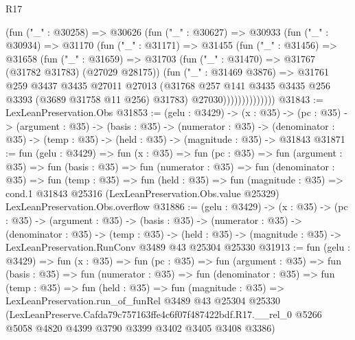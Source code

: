 \begin{lexlean}{R17}
\begin{coremodule}
                  (fun ("_" : @30258) =>
                  @30626
                    (fun ("_" : @30627) =>
                    @30933
                      (fun ("_" : @30934) =>
                      @31170
                        (fun ("_" : @31171) =>
                        @31455
                          (fun ("_" : @31456) =>
                          @31658
                            (fun ("_" : @31659) =>
                            @31703
                              (fun ("_" : @31470) => @31767 (@31782 @31783) (@27029 @28175))
                              (fun ("_" : @31469 @3876) =>
                              @31761
                                @259
                                @3437
                                @3435
                                @27011
                                @27013
                                (@31768
                                  @257
                                  @141
                                  @3435
                                  @3435
                                  @256
                                  @3393
                                  (@3689 @31758 @11 @256)
                                  @31783)
                                @27030))))))))))))))
@31843 := LexLeanPreservation.Obs
@31853 := (gelu : @3429) ->
  (x : @35) ->
  (pc : @35) ->
  (argument : @35) ->
  (basis : @35) ->
  (numerator : @35) ->
  (denominator : @35) -> (temp : @35) -> (held : @35) -> (magnitude : @35) -> @31843
@31871 := fun (gelu : @3429) =>
  fun (x : @35) =>
  fun (pc : @35) =>
  fun (argument : @35) =>
  fun (basis : @35) =>
  fun (numerator : @35) =>
  fun (denominator : @35) =>
  fun (temp : @35) =>
  fun (held : @35) =>
  fun (magnitude : @35) =>
  cond.{1} @31843 @25316 (LexLeanPreservation.Obs.value @25329) LexLeanPreservation.Obs.overflow
@31886 := (gelu : @3429) ->
  (x : @35) ->
  (pc : @35) ->
  (argument : @35) ->
  (basis : @35) ->
  (numerator : @35) ->
  (denominator : @35) ->
  (temp : @35) ->
  (held : @35) -> (magnitude : @35) -> LexLeanPreservation.RunConv @3489 @43 @25304 @25330
@31913 := fun (gelu : @3429) =>
  fun (x : @35) =>
  fun (pc : @35) =>
  fun (argument : @35) =>
  fun (basis : @35) =>
  fun (numerator : @35) =>
  fun (denominator : @35) =>
  fun (temp : @35) =>
  fun (held : @35) =>
  fun (magnitude : @35) =>
  LexLeanPreservation.run_of_funRel
    @3489
    @43
    @25304
    @25330
    (LexLeanPreserve.Cafda79c757163ffe4c6f07f487422bdf.R17.__rel_0
      @5266
      @5058
      @4820
      @4399
      @3790
      @3399
      @3402
      @3405
      @3408
      @3386)
\end{coremodule}
\end{lexlean}
